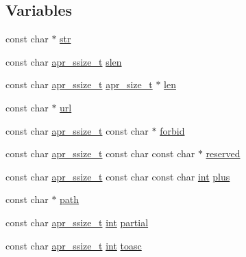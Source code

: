 \subsection*{Variables}
\begin{DoxyCompactItemize}
\item 
const char $\ast$ \hyperlink{group__APR__Util__Escaping_gaf25d6dc49269fa2003ac7c7fa6f13915}{str}
\item 
const char \hyperlink{group__apr__platform_ga215ebb88932bee220b766263ebbfe6fa}{apr\+\_\+ssize\+\_\+t} \hyperlink{group__APR__Util__Escaping_ga00eba03f583932b8cdcec6e0847f08b3}{slen}
\item 
const char \hyperlink{group__apr__platform_ga215ebb88932bee220b766263ebbfe6fa}{apr\+\_\+ssize\+\_\+t} \hyperlink{group__apr__platform_gaaa72b2253f6f3032cefea5712a27540e}{apr\+\_\+size\+\_\+t} $\ast$ \hyperlink{group__APR__Util__Escaping_ga7bba15b5e101edce457851318f1215c2}{len}
\item 
const char $\ast$ \hyperlink{group__APR__Util__Escaping_gaec657bef26e5ff27b9442563a591d9ec}{url}
\item 
const char \hyperlink{group__apr__platform_ga215ebb88932bee220b766263ebbfe6fa}{apr\+\_\+ssize\+\_\+t} const char $\ast$ \hyperlink{group__APR__Util__Escaping_ga3c95f651e057999c8be5e653e448eb18}{forbid}
\item 
const char \hyperlink{group__apr__platform_ga215ebb88932bee220b766263ebbfe6fa}{apr\+\_\+ssize\+\_\+t} const char const char $\ast$ \hyperlink{group__APR__Util__Escaping_ga8934de0ca6ba44b94f1e61b77c1dda41}{reserved}
\item 
const char \hyperlink{group__apr__platform_ga215ebb88932bee220b766263ebbfe6fa}{apr\+\_\+ssize\+\_\+t} const char const char \hyperlink{pcre_8txt_a42dfa4ff673c82d8efe7144098fbc198}{int} \hyperlink{group__APR__Util__Escaping_ga3e74db3f8ac18e5493d8ee6ca2e77078}{plus}
\item 
const char $\ast$ \hyperlink{group__APR__Util__Escaping_ga3b02c6de5c049804444a246f7fdf46b4}{path}
\item 
const char \hyperlink{group__apr__platform_ga215ebb88932bee220b766263ebbfe6fa}{apr\+\_\+ssize\+\_\+t} \hyperlink{pcre_8txt_a42dfa4ff673c82d8efe7144098fbc198}{int} \hyperlink{group__APR__Util__Escaping_ga226c953733af57b33839a23d273a4823}{partial}
\item 
const char \hyperlink{group__apr__platform_ga215ebb88932bee220b766263ebbfe6fa}{apr\+\_\+ssize\+\_\+t} \hyperlink{pcre_8txt_a42dfa4ff673c82d8efe7144098fbc198}{int} \hyperlink{group__APR__Util__Escaping_gaeffe77b0d0366fe62657f6d415baff99}{toasc}

\end{DoxyCompactItemize}
